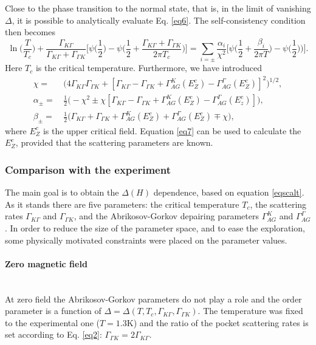 \documentclass[showpacs,superscriptaddress,onecolumn,prb]{revtex4}
\newcommand{\subsubsubsection}[1]{\paragraph{#1}\mbox{}\\}
\begin{document}
Close to the phase transition to the normal state, that is, in the limit of  vanishing $\Delta$, it is possible to analytically evaluate Eq. \eqref{eq6}. The self-consistency condition then becomes
\begin{equation}
\ln \bigg(\frac{T}{T_c}\bigg)+\frac{\Gamma_{K\Gamma}}{\Gamma_{K\Gamma}+\Gamma_{\Gamma K}}\bigg[\psi \bigg(\frac{1}{2}\bigg)-\psi \bigg(\frac{1}{2}+\frac{\Gamma_{K\Gamma}+\Gamma_{\Gamma K}}{2 \pi  T_c}\bigg)\bigg]= \sum_{i=\pm} \frac{\alpha_i}{\chi^2}\bigg[
\psi \bigg(\frac{1}{2}+\frac{\beta_i}{2\pi  T}\bigg)-\psi\bigg(\frac{1}{2}\bigg) \bigg)
\bigg].
\label{eq7}
\end{equation}  
Here $T_c$ is the critical temperature. Furthermore, we have introduced  
\begin{align}
\chi= &\,\bigg(4 \Gamma_{K\Gamma}\Gamma_{\Gamma K}+[\Gamma_{K\Gamma}-\Gamma_{\Gamma K}+\Gamma_{AG}^K(E_{Z}^{c})-\Gamma_{AG}^\Gamma(E_Z^{c})]^2\bigg)^{1/2}, \nonumber \\
\alpha_{\pm}= &\, \frac{1}{2}\bigg(-\chi^2\pm\chi [\Gamma_{K\Gamma}-\Gamma_{\Gamma K}+\Gamma_{AG}^K(E_{Z}^c)-\Gamma_{AG}^\Gamma(E_{z}^c)]\bigg), \nonumber  \\
\beta_{\pm}= & \,\frac{1}{2}\bigg(\Gamma_{K\Gamma}+\Gamma_{\Gamma K}+\Gamma_{AG}^K(E_Z^c)+\Gamma_{AG}^\Gamma(E_Z^c)\mp \chi \bigg),
\end{align}
where $E_Z^c$  is the upper critical field. Equation \eqref{eq7} can be used to calculate the $E_Z^c$, provided that the scattering parameters are known. 

\subsubsection{Comparison with the experiment}\label{sec:mcmillan_exp}

The main goal is to obtain the $\Delta(H)$ dependence, based on equation \eqref{eqscalt}. As it stands there are five parameters: the critical temperature $T_c$, the scattering rates $\Gamma_{K\Gamma}$ and $\Gamma_{\Gamma K}$, and the Abrikosov-Gorkov depairing parameters $\Gamma_{AG}^K$ and $\Gamma_{AG}^\Gamma$.
In order to reduce the size of the parameter space, and to ease the exploration, some physically motivated constraints were placed on the parameter values.\\

\subsubsubsection{Zero magnetic field}

At zero field the Abrikosov-Gorkov parameters do not play a role and the order parameter is a function of $\Delta = \Delta(T,T_c,\Gamma_{K\Gamma},\Gamma_{\Gamma K})$.
The temperature was fixed to the experimental one ($T=1.3\mathrm{K}$) and the ratio of the pocket scattering rates is set according to Eq. \eqref{eq2}: $\Gamma_{\Gamma K} = 2\Gamma_{K\Gamma}$. %
\end{document}
